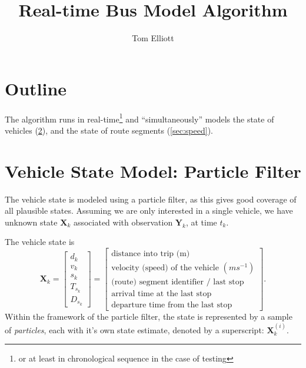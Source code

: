 \documentclass[14paper,twoside]{article}
\title{Real-time Bus Model Algorithm}
\author{Tom Elliott}
\date{}
\newcommand{\bX}{\mathbf{X}}
\newcommand{\bY}{\mathbf{Y}}
\begin{document}
\maketitle

\section{Outline}
\label{sec:outline}

The algorithm runs in real-time\footnote{or at least in chronological sequence in the case of testing}
and ``simultaneously'' models the state of vehicles (\cref{sec:bus}),
and the state of route segments (\cref{sec:speed}).



\section{Vehicle State Model: Particle Filter}
\label{sec:bus}


The vehicle state is modeled using a particle filter, 
as this gives good coverage of all plausible states.
Assuming we are only interested in a single vehicle,
we have unknown state $\bX_k$ associated with observation $\bY_k$,
at time $t_k$.


The vehicle state is
\begin{equation}
  \label{eq:vehicle_state}
  \bX_k = 
  \begin{bmatrix}
    d_k \\ v_k \\ s_k \\ T_{s_k} \\ D_{s_k}
  \end{bmatrix} =
  \left[
    \begin{array}{l}
      \text{distance into trip (m)} \\
      \text{velocity (speed) of the vehicle } (ms^{-1}) \\
      \text{(route) segment identifier / last stop} \\
      \text{arrival time at the last stop} \\
      \text{departure time from the last stop}
    \end{array}
  \right].
\end{equation}
Within the framework of the particle filter, the state is represented by a sample of \emph{particles},
each with it's own state estimate, denoted by a superscript: $\bX_k^{(i)}$.
\end{document}
